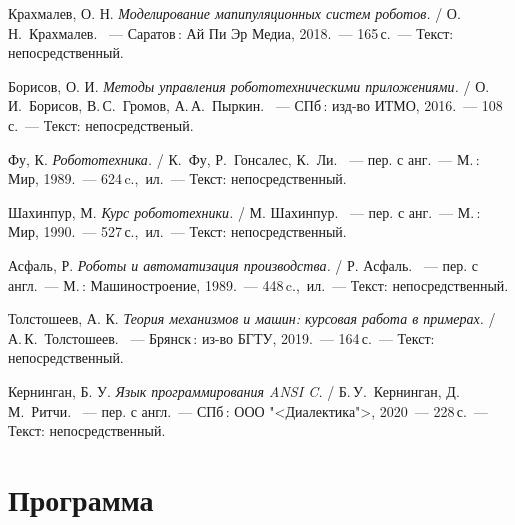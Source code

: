 \documentclass[oneside, final, 14pt]{extarticle}
\begin{document}
\begin{thebibliography}{00}

   Крахмалев, О. Н.
  \emph{Моделирование мапипуляционных систем роботов.}
  / О.\,Н.~Крахмалев.
  ~--- Саратов\,: Ай Пи Эр Медиа, 2018.~--- 165\,с.~--- Текст: непосредственный.

   Борисов, О. И.
  \emph{Методы управления робототехническими приложениями.}
  / О.\,И.~Борисов, В.\,С.~Громов, А.\,А.~Пыркин.
  ~--- СПб\,: изд-во ИТМО, 2016.~--- 108\,с.~--- Текст: непосредственый.

   Фу, К.
  \emph{Робототехника.}
  / К.~Фу, Р.~Гонсалес, К.~Ли.
  ~--- пер. с анг.~--- М.\,: Мир, 1989.~--- 624\,c.,~ил.~--- Текст: непосредственный.
  
   Шахинпур, М.
  \emph{Курс робототехники.}
  / М. Шахинпур.
  ~--- пер. с анг.~--- М.\,: Мир, 1990.~--- 527\,с.,~ил.~--- Текст: непосредственный.

   Асфаль, Р.
  \emph{Роботы и автоматизация производства.}
  / Р. Асфаль.
  ~--- пер. с англ.~--- М.\,: Машиностроение, 1989.~--- 448\,c.,~ил.~--- Текст: непосредственный.

   Толстошеев, А. К.
  \emph{Теория механизмов и машин: курсовая работа в примерах.}
  / А.\,К.~Толстошеев. 
  ~--- Брянск\,: из-во БГТУ, 2019.~--- 164\,с.~--- Текст: непосредственный.

   Кернинган, Б. У.
  \emph{Язык программирования ANSI C.}
  / Б.\,У.~Кернинган, Д.\,М.~Ритчи.
  ~--- пер. с англ.~--- СПб\,: ООО "<Диалектика">, 2020~--- 228\,с.~--- Текст: непосредственный.

\end{thebibliography}
\newpage

\appendix

\section{Программа}

\end{document}
